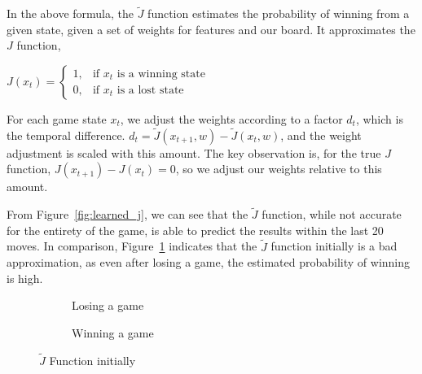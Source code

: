 \documentclass[11pt]{article}
\begin{document}
In the above formula, the $\tilde{J}$ function estimates the probability of
winning from a given state, given a set of weights for features and our board.
It approximates the $J$ function, \\

\begin{center}
$
J(x_t) = \begin{cases} 1, & \mbox{if } x_t\mbox{ is a winning state} \\ 0, & \mbox{if } x_t\mbox{ is a lost state} \end{cases}
$
\end{center}

For each game state $x_t$, we adjust the weights according to a factor $d_t$,
which is the temporal difference. $d_t = \tilde{J}(x_{t+1},w) -
\tilde{J}(x_t,w)$, and the weight adjustment is scaled with this amount. The
key observation is, for the true $J$ function, $J(x_{t+1}) - J(x_t) = 0$, so
we adjust our weights relative to this amount.

From Figure~\ref{fig:learned_j}, we can see that the
$\tilde{J}$ function, while not accurate for the entirety of the game, is able
to predict the results within the last 20 moves. In comparison,
Figure~\ref{fig:initial_j} indicates that the $\tilde{J}$ function
initially is a bad approximation, as even after losing a game, the estimated
probability of winning is high.

\begin{figure}[htbp]
  \begin{subfigure}{0.45\textwidth}
    \centering
    \caption{Losing a game}
  \end{subfigure}
  \hspace{1em}
  \begin{subfigure}{0.45\textwidth}
    \centering
    \caption{Winning a game}
  \end{subfigure}
  \caption{$\tilde{J}$ Function initially}
  \label{fig:initial_j}
\end{figure}
\end{document}
